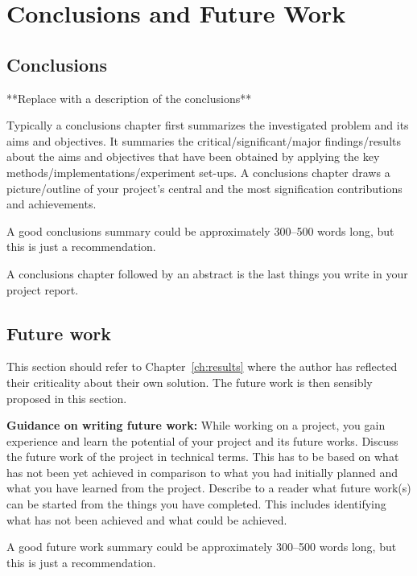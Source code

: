 \chapter{Conclusions and Future Work}
\label{ch:con}
\section{Conclusions}
**Replace with a description of the conclusions**


Typically a conclusions chapter first summarizes the investigated problem and its aims and objectives. It summaries the critical/significant/major findings/results about the aims and objectives that have been obtained by applying the key methods/implementations/experiment set-ups. A conclusions chapter draws a picture/outline of your project's central and the most signification contributions and achievements. 

A good conclusions summary could be approximately 300--500 words long, but this is just a recommendation.

A conclusions chapter followed by an abstract is the last things you write in your project report.

\section{Future work}
This section should refer to Chapter~\ref{ch:results} where the author has reflected their criticality about their own solution. The future work is then sensibly proposed in this section.

\textbf{Guidance on writing future work:} While working on a project, you gain experience and learn the potential of your project and its future works. Discuss the future work of the project in technical terms. This has to be based on what has not been yet achieved in comparison to what you had initially planned and what you have learned from the project. Describe to a reader what future work(s) can be started from the things you have completed. This includes identifying what has not been achieved and what could be achieved. 



A good future work summary could be approximately 300--500 words long, but this is just a recommendation.
